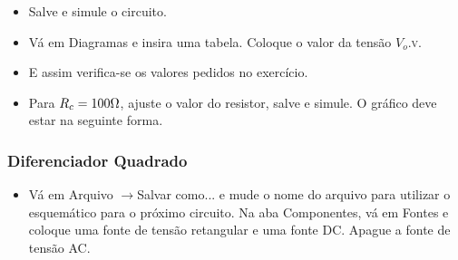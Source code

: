
\begin{itemize}
    \item Salve e simule o circuito.
\end{itemize}


\begin{itemize}
    \item Vá em Diagramas e insira uma tabela. Coloque o valor da tensão $V_o$.\textsc{v}.
\end{itemize}


\begin{itemize}
    \item E assim verifica-se os valores pedidos no exercício.
\end{itemize}


\begin{itemize}
    \item Para $R_c=100\ohm$, ajuste o valor do resistor, salve e simule. O gráfico deve estar na seguinte forma.
\end{itemize}


\newpage

\subsubsection{Diferenciador Quadrado}

\begin{itemize}
    \item Vá em Arquivo $\rightarrow$Salvar como... e mude o nome do arquivo para utilizar o esquemático para o próximo circuito. Na aba Componentes, vá em Fontes e coloque uma fonte de tensão retangular e uma fonte DC. Apague a fonte de tensão AC.
\end{itemize}

\begin{figure}[H]
    \centering
\end{figure}


